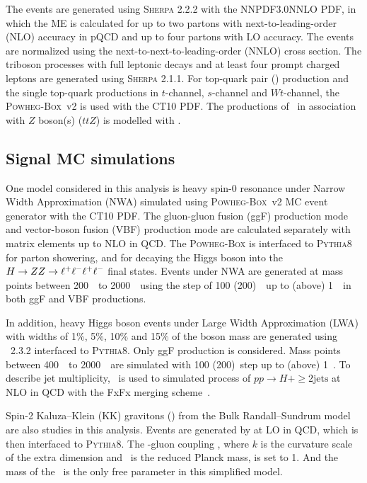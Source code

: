 The \Zjet events are generated using \textsc{Sherpa} 2.2.2 with the NNPDF3.0NNLO PDF,
in which the ME is calculated for up to two partons with next-to-leading-order (NLO) accuracy in pQCD and up to four partons with LO accuracy.
The \Zjet events are normalized using the next-to-next-to-leading-order (NNLO) cross section.
The triboson processes with full leptonic decays and at least four prompt charged leptons are generated using \textsc{Sherpa} 2.1.1.
For top-quark pair (\ttbar) production and the single top-quark productions in $t$-channel, $s$-channel and $Wt$-channel, the \textsc{Powheg-Box}~v2 is used with the CT10 PDF.
The productions of \ttbar~in association with $Z$ boson(s) ($ttZ$) is modelled with \MGMCatNLO.

\subsection{Signal MC simulations}

One model considered in this analysis is heavy spin-0 resonance under Narrow Width Approximation (NWA) simulated using \textsc{Powheg-Box}~v2 MC event generator with the CT10 PDF.
The gluon-gluon fusion (ggF) production mode and vector-boson fusion (VBF) production mode are calculated separately with matrix elements up to NLO in QCD.
The \textsc{Powheg-Box} is interfaced to \textsc{Pythia8} for parton showering, and for decaying the Higgs boson into the $H \rightarrow ZZ \rightarrow \ell^+\ell^-\ell^+\ell^-$ final states.
Events under NWA are generated at mass points between 200~\gev~to 2000~\gev~using the step of 100 (200)~\gev~up to (above) 1~\tev~in both ggF and VBF productions.

In addition, heavy Higgs boson events under Large Width Approximation (LWA) with widths of 1\%, 5\%, 10\% and 15\% of the boson mass are generated using \MGMCatNLO~2.3.2 interfaced to \textsc{Pythia8}.
Only ggF production is considered.
Mass points between 400~\gev~to 2000~\gev~are simulated with 100 (200)~\gev step up to (above) 1~\tev.
To describe jet multiplicity, \MGMCatNLO~is used to simulated process of $pp\to H + \geq2\text{jets}$ at NLO in QCD with the FxFx merging scheme~\cite{Frederix2012}.

Spin-2 Kaluza–Klein (KK) gravitons (\Graviton) from the Bulk Randall–Sundrum model~\cite{graviton} are also studies in this analysis.
Events are generated by \MGMCatNLO at LO in QCD, which is then interfaced to \textsc{Pythia8}.
The \Graviton-gluon coupling \kOverMpl, where $k$ is the curvature scale of the extra dimension and \Mpl~is the reduced Planck mass, is set to 1.
And the mass of the \Graviton~is the only free parameter in this simplified model.
